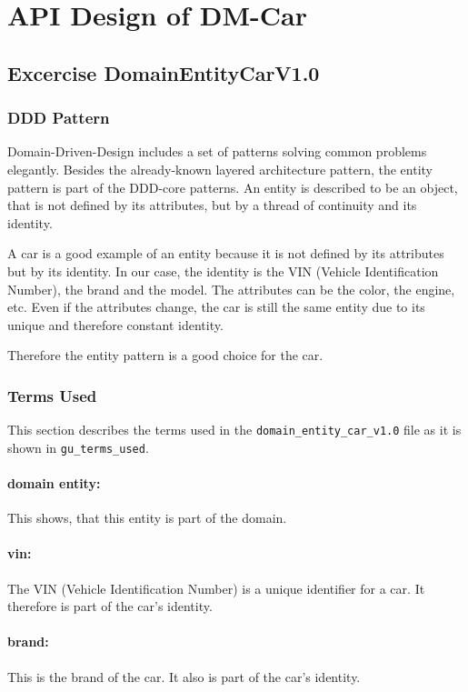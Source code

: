 \section{API Design of DM-Car}
\label{sec:api_design}
\subsection{Excercise DomainEntityCarV1.0}
\label{subsec:domain_entity_car_v1.0}
\subsubsection*{DDD Pattern}
Domain-Driven-Design includes a set of patterns solving common problems elegantly.
Besides the already-known layered architecture pattern, the entity pattern is part of the DDD-core patterns.
An entity is described to be an object, that is not defined by its attributes, but by a thread of continuity and its identity.

A car is a good example of an entity because it is not defined by its attributes but by its identity.
In our case, the identity is the VIN (Vehicle Identification Number), the brand and the model.
The attributes can be the color, the engine, etc.
Even if the attributes change, the car is still the same entity due to its unique and therefore constant identity.

Therefore the entity pattern is a good choice for the car.

\subsubsection*{Terms Used}
This section describes the terms used in the \texttt{domain\_entity\_car\_v1.0} file as it is shown in \texttt{gu\_terms\_used}.
\paragraph*{domain entity:}
This shows, that this entity is part of the domain.
\paragraph*{vin:}
The VIN (Vehicle Identification Number) is a unique identifier for a car.
It therefore is part of the car's identity.
\paragraph*{brand:}
This is the brand of the car.
It also is part of the car's identity.
